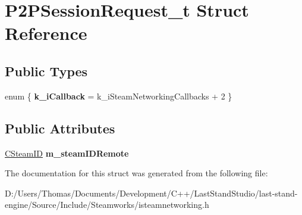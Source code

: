 \hypertarget{structP2PSessionRequest__t}{}\section{P2\+P\+Session\+Request\+\_\+t Struct Reference}
\label{structP2PSessionRequest__t}
\subsection*{Public Types}
\begin{DoxyCompactItemize}
\item 
\hypertarget{structP2PSessionRequest__t_a06899aa4e2c875ef0008232b1eb350b0}{}enum \{ {\bfseries k\+\_\+i\+Callback} = k\+\_\+i\+Steam\+Networking\+Callbacks + 2
 \}\label{structP2PSessionRequest__t_a06899aa4e2c875ef0008232b1eb350b0}

\end{DoxyCompactItemize}
\subsection*{Public Attributes}
\begin{DoxyCompactItemize}
\item 
\hypertarget{structP2PSessionRequest__t_ad307bad261d06d24bbb70549e3203b67}{}\hyperlink{classCSteamID}{C\+Steam\+I\+D} {\bfseries m\+\_\+steam\+I\+D\+Remote}\label{structP2PSessionRequest__t_ad307bad261d06d24bbb70549e3203b67}

\end{DoxyCompactItemize}


The documentation for this struct was generated from the following file\+:\begin{DoxyCompactItemize}
\item 
D\+:/\+Users/\+Thomas/\+Documents/\+Development/\+C++/\+Last\+Stand\+Studio/last-\/stand-\/engine/\+Source/\+Include/\+Steamworks/isteamnetworking.\+h\end{DoxyCompactItemize}
